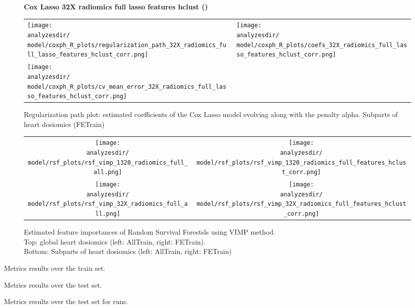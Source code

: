 \documentclass{article}
\begin{document}
{\begin{figure}[H]
\textbf{Cox Lasso 32X radiomics full lasso features hclust (\titlemodel)}
    \centering
    \begin{tabular}{ll}
        \texttt{[image: \\analyzesdir/\\model/coxph\_R\_plots/regularization\_path\_32X\_radiomics\_full\_lasso\_features\_hclust\_corr.png]} & 
        \texttt{[image: \\analyzesdir/\\model/coxph\_R\_plots/coefs\_32X\_radiomics\_full\_lasso\_features\_hclust\_corr.png]} \\ 
        \texttt{[image: \\analyzesdir/\\model/coxph\_R\_plots/cv\_mean\_error\_32X\_radiomics\_full\_lasso\_features\_hclust\_corr.png]} & \\
    \end{tabular}
    \caption{Regularization path plot: estimated coefficients of the Cox Lasso model evolving along with the penalty alpha. Subparts of heart dosiomics (FETrain)}
\end{figure}

\begin{figure}[H]
    \centering
    \begin{tabular}{cc}
    \texttt{[image: \\analyzesdir/\\model/rsf\_plots/rsf\_vimp\_1320\_radiomics\_full\_all.png]}
    &  
    \texttt{[image: \\analyzesdir/\\model/rsf\_plots/rsf\_vimp\_1320\_radiomics\_full\_features\_hclust\_corr.png]} \\
    \texttt{[image: \\analyzesdir/\\model/rsf\_plots/rsf\_vimp\_32X\_radiomics\_full\_all.png]}
    &
    \texttt{[image: \\analyzesdir/\\model/rsf\_plots/rsf\_vimp\_32X\_radiomics\_full\_features\_hclust\_corr.png]} \\
    \end{tabular}
    \caption{Estimated feature importances of Random Survival Forestsls using VIMP method.\\
    Top: global heart dosiomics (left: AllTrain, right: FETrain). \\
    Bottom: Subparts of heart dosiomics (left: AllTrain, right: FETrain)}
\end{figure}

\begin{table}[h]
    \centering
    \small
    
    \caption{Metrics results over the train set.}
    \label{tab:my_label}
\end{table}

\begin{table}[h]
    \centering
    \small
    
    \caption{Metrics results over the test set.}
    \label{tab:my_label}
\end{table}

\begin{table}[h]
    \centering
    \small
    
    \caption{Metrics results over the test set for \nbestim runs.}
    \label{tab:my_label}
\end{table}
}
\end{document}
